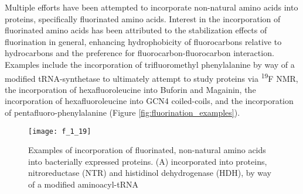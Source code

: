 \begin{refsection}
Multiple efforts have been attempted to incorporate non-natural amino acids into
proteins, specifically fluorinated amino
acids.\cite{Meng2007,Lee2004,Son2006,Li2010a,Woll2006} Interest in the
incorporation of fluorinated amino acids has been attributed to the
stabilization effects of fluorination in general, enhancing hydrophobicity of
fluorocarbons relative to hydrocarbons and the preference for
fluorocarbon-fluorocarbon
interaction.\cite{Woll2006,Lee2004,Marsh2009,Jackel2006,Yoder2002} Examples
include the incorporation of trifluoromethyl phenylalanine by way of a modified
tRNA-synthetase to ultimately attempt to study  proteins via
\textsuperscript{19}F NMR,\cite{Li2010a,Jackson2007} the incorporation of hexafluoroleucine into
Buforin and Magainin,\cite{Meng2007} the incorporation of hexafluoroleucine into
GCN4 coiled-coils,\cite{Lee2004} and the incorporation of
pentafluoro-phenylalanine\cite{Woll2006} (Figure
\ref{fig:fluorination_examples}).
\begin{figure}[h!] \centering \texttt{[image: f\_1\_19]}
    \caption[Examples of incorporation of fluorinated, non-natural amino acids
        into bacterially expressed proteins.
        (A)
         incorporated into
         proteins, nitroreductase (NTR) and histidinol
        dehydrogenase (HDH), by way of a modified aminoacyl-tRNA
        synthetase.
        (B)
        Incorporation of  into anti-microbial
        peptides, buforin and magainin, resulting in enhanced activity and
        protease stability.
        (C) Structural stability of GCN4 coiled-coils by way
        of incorporation of  into the hydrophobic
        core region, as evidenced by an increase in ${\Delta\Delta G}$.
        (D)
        Incorporation of  into the non-polar
        core of chicken villin headpiece sub-domain (cVHP) defined by three
        phenylalanine residues.]
        {Examples of incorporation of fluorinated, non-natural amino acids
        into bacterially expressed proteins.
        (A)
         incorporated into
         proteins, nitroreductase (NTR) and histidinol
        dehydrogenase (HDH), by way of a modified aminoacyl-tRNA
}
\end{figure}
\end{refsection}

